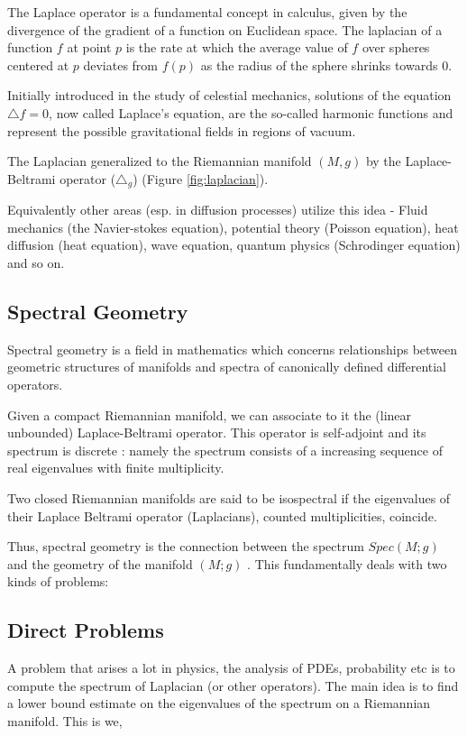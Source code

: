 \documentclass[a4paper,10pt]{article}
\begin{document}
The Laplace operator is a fundamental concept in calculus, given by the divergence of the gradient of a function on Euclidean space. The laplacian of a function $ f $ at point $ p $ is the rate at which the average value of $ f $ over spheres centered at $ p $ deviates from $ f(p) $ as the radius of the sphere shrinks towards 0.

Initially introduced in the study of celestial mechanics, solutions of the equation $ \triangle f = 0 $, now called Laplace's equation, are the so-called harmonic functions and represent the possible gravitational fields in regions of vacuum.

The Laplacian generalized to the Riemannian manifold $ (M,g) $ by the Laplace-Beltrami operator ($ {\triangle}_g $) (Figure \ref{fig:laplacian}). 

Equivalently other areas (esp. in diffusion processes) utilize this idea - Fluid mechanics (the Navier-stokes equation), potential theory (Poisson equation), heat diffusion (heat equation), wave equation, quantum physics (Schrodinger equation) and so on.

\subsection{Spectral Geometry}

Spectral geometry is a field in mathematics which concerns relationships between geometric structures of manifolds and spectra of canonically defined differential operators.

Given a compact Riemannian manifold, we can associate to it the (linear unbounded) Laplace-Beltrami operator. This operator is self-adjoint and its spectrum is discrete : namely the spectrum consists of a increasing sequence of real eigenvalues with finite multiplicity.

Two closed Riemannian manifolds are said to be isospectral if the eigenvalues of their Laplace Beltrami operator (Laplacians), counted multiplicities, coincide.

Thus, spectral geometry is the connection between the spectrum $ Spec(M; g) $ and the geometry of the manifold $ (M; g) $ \cite{Yiaza}. This fundamentally deals with two kinds of problems:

\subsection{Direct Problems}

A problem that arises a lot in physics, the analysis of PDEs, probability etc is to compute the spectrum of Laplacian (or other operators). The main idea is to find a lower bound estimate on the eigenvalues of the spectrum on a Riemannian manifold. This is we,
\end{document}

